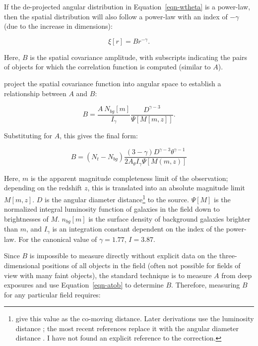 \documentclass{emulateapj}
\begin{document}
If the de-projected angular distribution in Equation~\ref{eqn-wtheta} is a power-law, then the spatial distribution will also follow a power-law with an index of $-\gamma$ (due to the increase in dimensions):

\begin{equation}
\xi[r] = Br^{-\gamma}.
\end{equation}

\noindent Here, $B$ is the spatial covariance amplitude, with subscripts indicating the pairs of objects for which the correlation function is computed (similar to $A$). 


\citet{lon79} project the spatial covariance function into angular space to establish a relationship between $A$ and $B$: 

\begin{equation}
\label{eqn-atob}
B = \frac{A~N_{bg}[m]}{I_\gamma} \frac{D^{\gamma-3}}{\Psi[M[m,z]]}.
\end{equation}

Substituting for $A$, this gives the final form:

\begin{equation}
\label{eqn-bgb}
B = (N_t - N_{bg})\frac{(3-\gamma) D^{\gamma-3} \theta^{\gamma-1}}{2 A_\theta I_\gamma \Psi[M(m,z)]}
\end{equation}

\noindent Here, $m$ is the apparent magnitude completeness limit of the observation; depending on the redshift $z$, this is translated into an absolute magnitude limit $M[m,z]$. $D$ is the angular diameter distance\footnote{\citet{lon79} give this value as the co-moving distance. Later derivations use the luminosity distance \citep[eg,][]{yee87,ell91}; the most recent references replace it with the angular diameter distance \citep{yee99,muz07,zau07}. I have not found an explicit reference to the correction.} to the source. $\Psi[M]$ is the normalized integral luminosity function of galaxies in the field down to brightnesses of $M$. $n_{bg}[m]$ is the surface density of background galaxies brighter than $m$, and $I_\gamma$ is an integration constant dependent on the index of the power-law. For the canonical value of $\gamma=1.77$, $I=3.87$.  

Since $B$ is impossible to measure directly without explicit data on the three-dimensional positions of all objects in the field (often not possible for fields of view with many faint objects), the standard technique is to measure $A$ from deep exposures and use Equation~\ref{eqn-atob} to determine $B$. Therefore, measuring $B$ for any particular field requires:
\end{document}
